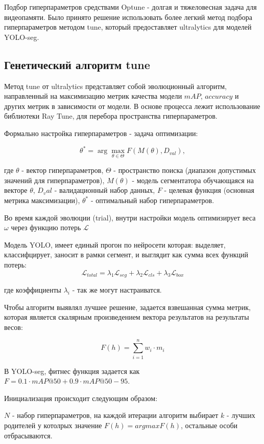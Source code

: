 \documentclass[areasetadvanced]{scrartcl}
\begin{document}
Подбор гиперпараметров средствами Optune - долгая и тяжеловесная задача для видеопамяти. Было принято решение использовать более легкий метод подбора гиперпараметров методом tune, который предоставляет ultralytics для моделей YOLO-seg.

\subsection{Генетический алгоритм tune}
Метод tune от ultralytics представляет собой эволюционный алгоритм, направленный на максимизацию метрик качества модели $mAP$, $accuracy$ и других метрик в зависимости от модели. 
В основе процесса лежит использование библиотеки Ray Tune, для перебора пространства гиперпараметров. 

Формально настройка гиперпараметров - задача оптимизации:

$$
    \theta^* = \arg \max_{\theta \in \Theta} F(M(\theta), D_{val}),
$$

где $\theta$ - вектор гиперпараметров, $\Theta$ - пространство поиска (диапазон допустимых значений для гиперпараметров), 
$M(\theta)$ - модель сегментатора обучающаяся на векторе $\theta$, $D_val$ - валидационный набор данных, $F$ - целевая функция (основная метрика максимизации),
$\theta^*$ - оптимальный набор гиперпараметров.

Во время каждой эволюции (trial), внутри настройки модель оптимизирует веса $\omega$ через функцию потерь $ \mathcal{L}$

Модель YOLO, имеет единый прогон по нейросети которая: выделяет, классифцирует, заносит в рамки сегмент, и выглядит как сумма всех функций потерь:
$$
     \mathcal{L}_{total} = \lambda_1  \mathcal{L}_{seg} + \lambda_2  \mathcal{L}_{cls} + \lambda_3  \mathcal{L}_{box}
$$

где коэффициенты $\lambda_i$ - так же могут настраиватся.

Чтобы алгоритм выявлял лучшее решение, задается взвешанная сумма метрик, которая является скалярным произведением вектора 
результатов на результаты весов:

$$
    F(h) = \sum_{i=1}^{n} w_i \cdot m_i
$$

В YOLO-seg, фитнес функция задается как $F = 0.1 \cdot mAP@50 + 0.9 \cdot mAP@50 - 95$.

Инициализация происходит следующим образом:

$N$ - набор гиперпараметров, на каждой итерации алгоритм выбирает $k$ - лучших родителей у котолрых значение $F(h) = argmax F(h)$, 
остальные особи отбрасываются.
\end{document}

